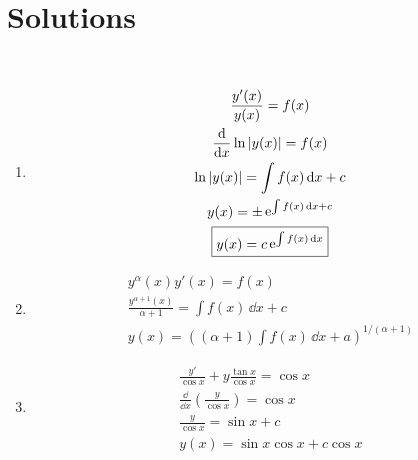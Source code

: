 \section{Solutions}



\begin{Solution}
  \label{solution gygyf}
  $\phantom{a}$

  \begin{enumerate}
  \item
    \begin{gather*}
      \frac{y'(x)}{y(x)} = f(x) 
      \\
      \frac{\mathrm{d}}{\mathrm{d} x} \ln |y(x)| = f(x) 
      \\
      \ln |y(x)| = \int f(x) \,\mathrm{d} x + c 
      \\
      y(x) = \pm \mathop{\mathrm{e}}\nolimits^{\int f(x) \,\mathrm{d} x + c} 
      \\
      \boxed{
        y(x) = c \mathop{\mathrm{e}}\nolimits^{\int f(x) \,\mathrm{d} x} 
        }
    \end{gather*}
  \item
    \begin{gather*}
      y^\alpha(x) y'(x) = f(x) 
      \\
      \frac{ y^{\alpha+1}(x) }{ \alpha + 1 } = \int f(x)\,\dd x + c 
      \\
      \boxed{
        y(x) = \left( (\alpha+1) \int f(x)\,\dd x + a \right)^{1/(\alpha+1)}
        }
    \end{gather*}
  \item
    \begin{gather*} 
      \frac{y'}{\cos x} + y \frac{\tan x}{\cos x} = \cos x 
      \\
      \frac{\dd}{\dd x} \left( \frac{y}{\cos x} \right) = \cos x 
      \\
      \frac{y}{\cos x} =  \sin x + c 
      \\
      \boxed{ 
        y(x) = \sin x \cos x + c \cos x
        } 
    \end{gather*}
  \end{enumerate}
\end{Solution}





